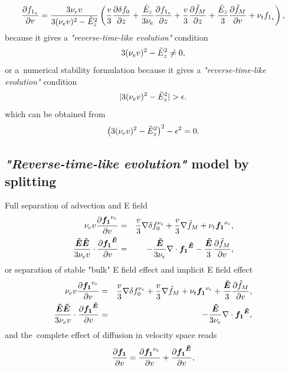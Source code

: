 \begin{equation}
  \frac{\partial{f_{1_z}}}{\partial{v}} = 
  \frac{3 \nu_{e}v}{3 (\nu_{e}v)^2 - \tilde{E}_z^2}
  \left(
  \frac{v}{3}\frac{\partial{\delta f_0}}{\partial{z}} + \frac{\tilde{E}_z}{3 \nu_{e}}\frac{\partial{f_{1_z}}}{\partial{z}}
  + \frac{v}{3}\frac{\partial{\tilde{f}_M}}{\partial{z}} + \frac{\tilde{E}_z}{3}\frac{\partial{\tilde{f}_M}}{\partial{v}} 
  + \nu_{t}f_{1_z}\right) ,
  \label{eq:OOE_P1AWBS_model_1Danalysis}
\end{equation}
because it gives a \textit{"reverse-time-like evolution"} condition
\begin{equation}
  3(\nu_{e}v)^2 - \tilde{E}_z^2 \neq 0 ,
  \nonumber
\end{equation}
or a~numerical stability formulation
because it gives a \textit{"reverse-time-like evolution"} condition
\begin{equation}
  |3(\nu_{e}v)^2 - \tilde{E}_z^2| > \epsilon .
  \label{eq:OOE_reverse_time_condition}
\end{equation}
which can be obtained from
\begin{equation}
  \left(3(\nu_{e}v)^2 - \tilde{E}_z^2\right)^2 - \epsilon^2 = 0 .
  \label{eq:OOE_reverse_time_condition}
\end{equation}

\subsection{\textit{"Reverse-time-like evolution"} model by splitting}
\label{sec:OOE_stable_splitting}
Full separation of advection and E field
\begin{eqnarray}
  \nu_{e}v \frac{\partial{{\boldsymbol{f_1}}^{\nu_{e}}}}{\partial{v}} &=& 
  \frac{v}{3}\nabla\delta f_0^{\nu_{e}}
  + \frac{v}{3}\nabla\tilde{f}_M + \nu_{t}{\boldsymbol{f_1}}^{\nu_{e}} ,
  \nonumber \\
  \frac{\boldsymbol{\tilde{E}}\boldsymbol{\tilde{E}}}{3 \nu_{e}v}\cdot
  \frac{\partial{{\boldsymbol{f_1}}^{\boldsymbol{\tilde{E}}}}}{\partial{v}} &=& -\frac{\boldsymbol{\tilde{E}}}{3 \nu_{e}}\nabla\cdot{\boldsymbol{f_1}}^{\boldsymbol{\tilde{E}}} 
  - \frac{\boldsymbol{\tilde{E}}}{3}\frac{\partial{\tilde{f}_M}}{\partial{v}},
  \nonumber
\end{eqnarray}
or separation of stable "bulk" E field effect and implicit E field effect
\begin{eqnarray}
  \nu_{e}v \frac{\partial{{\boldsymbol{f_1}}^{\nu_{e}}}}{\partial{v}} &=& 
  \frac{v}{3}\nabla\delta f_0^{\nu_{e}}
  + \frac{v}{3}\nabla\tilde{f}_M + \nu_{t}{\boldsymbol{f_1}}^{\nu_{e}} 
  + \frac{\boldsymbol{\tilde{E}}}{3}\frac{\partial{\tilde{f}_M}}{\partial{v}},
  \nonumber \\
  \frac{\boldsymbol{\tilde{E}}\boldsymbol{\tilde{E}}}{3 \nu_{e}v}\cdot
  \frac{\partial{{\boldsymbol{f_1}}^{\boldsymbol{\tilde{E}}}}}{\partial{v}} &=& -\frac{\boldsymbol{\tilde{E}}}{3 \nu_{e}}\nabla\cdot{\boldsymbol{f_1}}^{\boldsymbol{\tilde{E}}} ,
  \nonumber
\end{eqnarray}
and the~complete effect of diffusion in velocity space reads
\begin{equation}
  \frac{\partial{{\boldsymbol{f_1}}}}{\partial{v}} = \frac{\partial{{\boldsymbol{f_1}}^{\nu_{e}}}}{\partial{v}} + \frac{\partial{{\boldsymbol{f_1}}^{\boldsymbol{\tilde{E}}}}}{\partial{v}} ,
  \nonumber
\end{equation}

